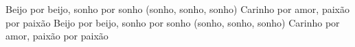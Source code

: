 \beginchorus
Beijo por beijo, sonho por sonho (sonho, sonho, sonho)
Carinho por amor, paixão por paixão
Beijo por beijo, sonho por sonho (sonho, sonho, sonho)
Carinho por amor, paixão por paixão
\endchorus
{}
\vspace{4em} %
\begin{comment}
\lstset{basicstyle=\scriptsize\bf} %
\tab{Solo 1}
\begin{lstlisting}
E|-----------------------------------------------------|
B|-----------------------------------------------------|
G|-----------------------------------------------------|
D|-----------------------------------------------------|
A|-----------------------------------------------------|
E|-----------------------------------------------------|
\end{lstlisting}
\end{comment}
\begin{comment}

\color{drawChord}\gtab{\color{nameChord} X}{}%
\color{drawChord}\gtab{\color{nameChord} X}{}%
\color{drawChord}\gtab{\color{nameChord} X}{}%
\color{drawChord}\gtab{\color{nameChord} X}{}%

\end{comment}
\endsong
